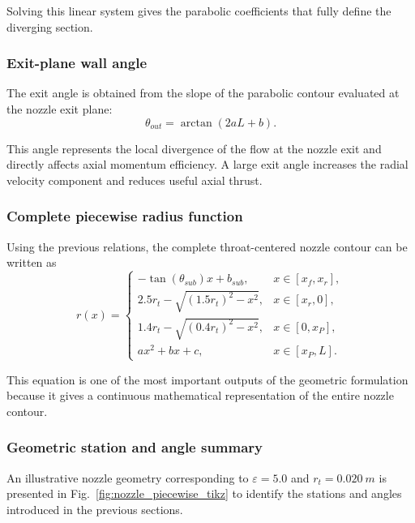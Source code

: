 \documentclass[11pt,a4paper]{article}
\begin{document}
Solving this linear system gives the parabolic coefficients that fully define the diverging section.

\subsubsection{Exit-plane wall angle}

The exit angle is obtained from the slope of the parabolic contour evaluated at the nozzle exit plane:
\begin{equation}
\theta_{out}=\arctan\left(2aL+b\right).
\label{eq:theta_out}
\end{equation}

This angle represents the local divergence of the flow at the nozzle exit and directly affects axial momentum efficiency. A large exit angle increases the radial velocity component and reduces useful axial thrust.

\subsubsection{Complete piecewise radius function}

Using the previous relations, the complete throat-centered nozzle contour can be written as
\begin{equation}
r(x)=
\begin{cases}
-\tan(\theta_{sub})x+b_{sub},
& x\in[x_f,x_r],\\[6pt]
2.5r_t-\sqrt{(1.5r_t)^2-x^2},
& x\in[x_r,0],\\[6pt]
1.4r_t-\sqrt{(0.4r_t)^2-x^2},
& x\in[0,x_P],\\[6pt]
ax^2+bx+c,
& x\in[x_P,L].
\end{cases}
\label{eq:piecewise_nozzle}
\end{equation}

This equation is one of the most important outputs of the geometric formulation because it gives a continuous mathematical representation of the entire nozzle contour.

\subsubsection{Geometric station and angle summary}

An illustrative nozzle geometry corresponding to $\varepsilon=5.0$ and $r_t=\SI{0.020}{m}$ is presented in Fig.~\ref{fig:nozzle_piecewise_tikz} to identify the stations and angles introduced in the previous sections.
\end{document}
